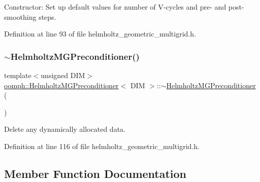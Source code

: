 Constructor\+: Set up default values for number of V-\/cycles and pre-\/ and post-\/smoothing steps. 



Definition at line 93 of file helmholtz\+\_\+geometric\+\_\+multigrid.\+h.

\mbox{\label{classoomph_1_1HelmholtzMGPreconditioner_adf5e9f25f44d6447c6368da87de8057e}} 
\subsubsection{\texorpdfstring{$\sim$\+Helmholtz\+M\+G\+Preconditioner()}{~HelmholtzMGPreconditioner()}}
{\footnotesize\ttfamily template$<$unsigned D\+IM$>$ \\
\hyperlink{classoomph_1_1HelmholtzMGPreconditioner}{oomph\+::\+Helmholtz\+M\+G\+Preconditioner}$<$ D\+IM $>$\+::$\sim$\hyperlink{classoomph_1_1HelmholtzMGPreconditioner}{Helmholtz\+M\+G\+Preconditioner} (\begin{DoxyParamCaption}{ }\end{DoxyParamCaption})\hspace{0.3cm}{\ttfamily [inline]}}



Delete any dynamically allocated data. 



Definition at line 116 of file helmholtz\+\_\+geometric\+\_\+multigrid.\+h.



\subsection{Member Function Documentation}
\mbox{\label{classoomph_1_1HelmholtzMGPreconditioner_aa9eda48c76fd82d49e7b301d337a38d2}} 
